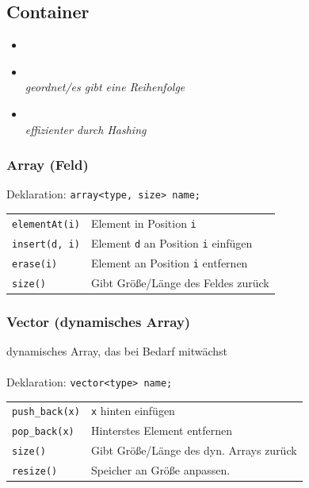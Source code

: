 \documentclass[fs, footer]{latex4ei}
\renewcommand{\t}{\texttt}
\begin{document}
\begin{multicols*}{4}
{{\subsection{Container}
\begin{itemize}
	\item {}
	\item {} \\ \textit{geordnet/es gibt eine Reihenfolge}
	\item {} \\\textit{effizienter durch Hashing}
\end{itemize}

\subsubsection{Array (Feld)}
Deklaration: \t{array<type, size> name;}\\
\begin{tabular}{ll}
\t{elementAt(i)}& Element in Position \t{i}\\
\t{insert(d, i)}& Element \t{d} an Position \t{i} einfügen\\
\t{erase(i)}& Element an Position \t{i} entfernen\\
\t{size()}& Gibt Größe/Länge des Feldes zurück\\

\end{tabular}
\subsubsection{Vector (dynamisches Array)}
dynamisches Array, das bei Bedarf mitwächst\\ \\
Deklaration: \t{vector<type> name;}\\
\begin{tabular}{ll}
\t{push\_back(x)}& \t{x} hinten einfügen\\
\t{pop\_back(x)}& Hinterstes Element entfernen\\
\t{size()}& Gibt Größe/Länge des dyn. Arrays zurück\\
\t{resize()}& Speicher an Größe anpassen.\\

\end{tabular}

}}
\end{multicols*}
\end{document}
